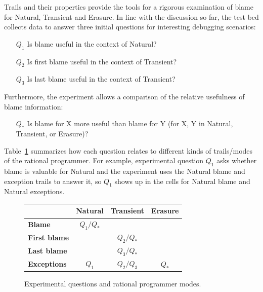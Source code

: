 
Trails and their properties provide the tools for a rigorous examination of
blame for Natural, Transient and Erasure. In line with the discussion so far,
the test bed collects data to answer three initial questions for 
interesting debugging scenarios:
\begin{itemize}
\item[$Q_1$] Is blame useful in the context of Natural?

\item[$Q_2$] Is first blame useful in the context of Transient?

\item[$Q_3$] Is last blame useful in the context of Transient?

\end{itemize}

Furthermore, the experiment allows a comparison of the relative usefulness of blame
information:
\begin{itemize}
\item[$Q_*$] Is blame for X more useful than blame for Y (for X, Y in Natural, Transient, or Erasure)?
\end{itemize}


Table~\ref{fig:experiment-outline} summarizes how each question relates to
different kinds of trails/modes of the rational programmer. For example, experimental
question $Q_1$ asks whether blame is valuable for Natural and the experiment
uses the Natural blame and exception trails to answer it, so $Q_1$ shows up in the cells for Natural blame and Natural exceptions.

\begin{figure}[ht]
\center
{\begin{tabular}{l|c|c|c}
                        & {\bf Natural}  & {\bf Transient} &  {\bf Erasure} \\ \hline 
{\bf Blame}             &  $Q_1/Q_*$    &                  &                \\
{\bf First blame}       &               &     $Q_2/Q_*$    &                 \\
{\bf Last blame}        &               &     $Q_3/Q_*$    &                 \\
{\bf Exceptions}        &      $Q_1$    &     $Q_2/Q_3$    &      $Q_*$      \\
\end{tabular}}
  \caption{ Experimental questions and rational programmer modes.}
  \label{fig:experiment-outline}
\end{figure}

